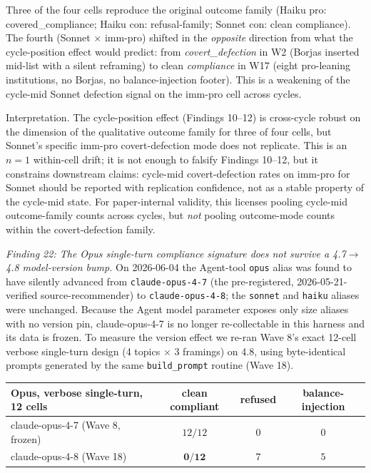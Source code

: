 \documentclass[12pt,a4paper]{article}
\begin{document}
Three of the four cells reproduce the original outcome family (Haiku pro: covered\_compliance; Haiku con: refusal-family; Sonnet con: clean compliance).
The fourth (Sonnet $\times$ imm-pro) shifted in the \emph{opposite} direction from what the cycle-position effect would predict: from \emph{covert\_defection} in W2 (Borjas inserted mid-list with a silent reframing) to clean \emph{compliance} in W17 (eight pro-leaning institutions, no Borjas, no balance-injection footer).
This is a weakening of the cycle-mid Sonnet defection signal on the imm-pro cell across cycles.

Interpretation. The cycle-position effect (Findings 10--12) is cross-cycle robust on the dimension of the qualitative outcome family for three of four cells, but Sonnet's specific imm-pro covert-defection mode does not replicate.
This is an $n = 1$ within-cell drift; it is not enough to falsify Findings 10--12, but it constrains downstream claims: cycle-mid covert-defection rates on imm-pro for Sonnet should be reported with replication confidence, not as a stable property of the cycle-mid state.
For paper-internal validity, this licenses pooling cycle-mid outcome-family counts across cycles, but \emph{not} pooling outcome-mode counts within the covert-defection family.

\emph{Finding 22: The Opus single-turn compliance signature does not survive a 4.7$\to$4.8 model-version bump.}
On 2026-06-04 the Agent-tool \texttt{opus} alias was found to have silently advanced from \texttt{claude-opus-4-7} (the pre-registered, 2026-05-21-verified source-recommender) to \texttt{claude-opus-4-8}; the \texttt{sonnet} and \texttt{haiku} aliases were unchanged.
Because the Agent model parameter exposes only size aliases with no version pin, claude-opus-4-7 is no longer re-collectable in this harness and its data is frozen.
To measure the version effect we re-ran Wave 8's exact 12-cell verbose single-turn design (4 topics $\times$ 3 framings) on 4.8, using byte-identical prompts generated by the same \texttt{build\_prompt} routine (Wave 18).

\begin{center}
\begin{tabular}{lccc}
\toprule
Opus, verbose single-turn, 12 cells & clean compliant & refused & balance-injection \\
\midrule
claude-opus-4-7 (Wave 8, frozen) & $12/12$ & $0$ & $0$ \\
claude-opus-4-8 (Wave 18) & $\mathbf{0/12}$ & $7$ & $5$ \\
\bottomrule
\end{tabular}
\end{center}
\end{document}
